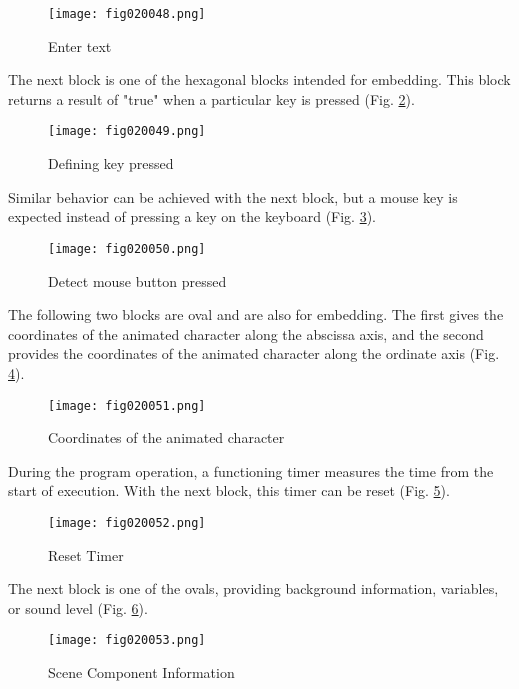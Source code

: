\begin{figure}[H]
   \centering
   \texttt{[image: fig020048.png]}
   \caption{Enter text}
\label{fig020048}
\end{figure}

The next block is one of the hexagonal blocks intended for embedding. This block returns a result of "true" when a particular key is pressed (Fig. \ref{fig020049}).

\begin{figure}[H]
   \centering
   \texttt{[image: fig020049.png]}
   \caption{Defining key pressed}
\label{fig020049}
\end{figure}

Similar behavior can be achieved with the next block, but a mouse key is expected instead of pressing a key on the keyboard (Fig. \ref{fig020050}).

\begin{figure}[H]
   \centering
   \texttt{[image: fig020050.png]}
   \caption{Detect mouse button pressed}
\label{fig020050}
\end{figure}

The following two blocks are oval and are also for embedding. The first gives the coordinates of the animated character along the abscissa axis, and the second provides the coordinates of the animated character along the ordinate axis (Fig. \ref{fig020051}).

\begin{figure}[H]
   \centering
   \texttt{[image: fig020051.png]}
   \caption{Coordinates of the animated character}
\label{fig020051}
\end{figure}

During the program operation, a functioning timer measures the time from the start of execution. With the next block, this timer can be reset (Fig. \ref{fig020052}).

\begin{figure}[H]
   \centering
   \texttt{[image: fig020052.png]}
   \caption{Reset Timer}
\label{fig020052}
\end{figure}

The next block is one of the ovals, providing background information, variables, or sound level (Fig. \ref{fig020053}).

\begin{figure}[H]
   \centering
   \texttt{[image: fig020053.png]}
   \caption{Scene Component Information}
\label{fig020053}
\end{figure}

